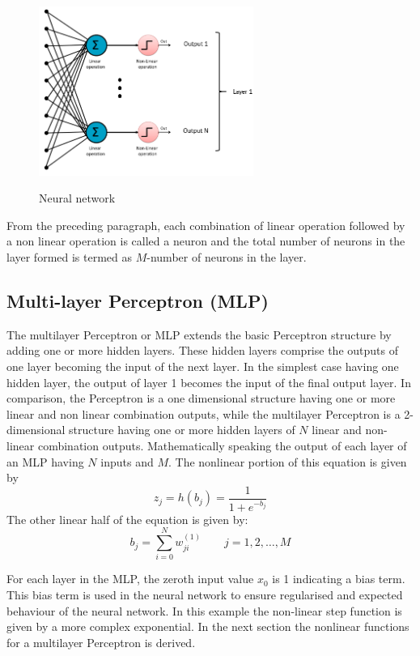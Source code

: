 \begin{figure}
\centering
  \includegraphics[width=7cm]{thesis/images/ptron3.png}\\
  \caption{Neural network} \label{fig_3_2_nn}
\end{figure}

From the preceding paragraph, each combination of linear operation followed by a non linear operation is called a neuron and the total number of neurons in the layer formed is termed as $M$-number of neurons in the layer.

\subsection{Multi-layer Perceptron (MLP)}
The multilayer Perceptron or MLP extends the basic Perceptron structure by adding one or more hidden layers.  These hidden layers comprise the outputs of one layer becoming the input of the next layer. In the simplest case having one hidden layer, the output of layer 1 becomes the input of the final output layer.  In comparison, the Perceptron is a one dimensional structure having one or more linear and non linear combination outputs, while the multilayer Perceptron is a 2-dimensional structure having one or more hidden layers of $N$ linear and non-linear combination outputs.  Mathematically speaking the output of each layer of an MLP having $N$ inputs and $M$.  The nonlinear portion of this equation is given by
\begin{equation}
z_j=h(b_j)=\frac{1}{ 1+e^{-b_j}} 
\label{eqn_c3_nn_01}
\end{equation}
 The other linear half of the equation is given by:
\begin{equation}
b_j=\sum_{i=0}^Nw_{ji}^{(1)}\qquad j=1,2,\dots,M
\label{eqn_c3_nn_02}
\end{equation}

For each layer in the MLP, the zeroth input value $x_0$ is 1 indicating a bias term.  This bias term is used in the neural network to ensure regularised and expected behaviour of the neural network.  In this example the non-linear step function is given by a more complex exponential.  In the next section the nonlinear functions for a multilayer Perceptron is derived.
